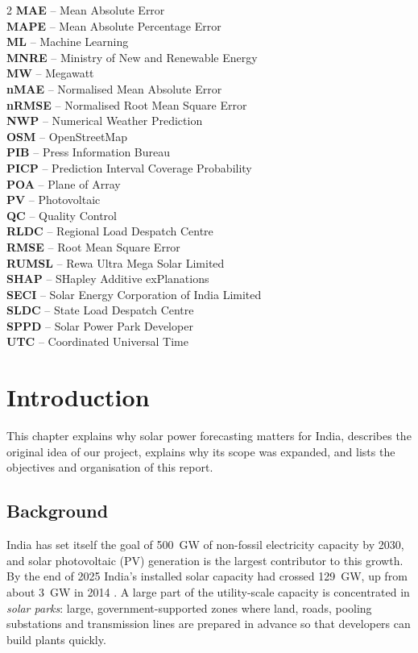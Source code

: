 \documentclass[12pt]{report}
\begin{document}
\begin{multicols}{2}
\textbf{MAE} -- Mean Absolute Error\\
\textbf{MAPE} -- Mean Absolute Percentage Error\\
\textbf{ML} -- Machine Learning\\
\textbf{MNRE} -- Ministry of New and Renewable Energy\\
\textbf{MW} -- Megawatt\\
\textbf{nMAE} -- Normalised Mean Absolute Error\\
\textbf{nRMSE} -- Normalised Root Mean Square Error\\
\textbf{NWP} -- Numerical Weather Prediction\\
\textbf{OSM} -- OpenStreetMap\\
\textbf{PIB} -- Press Information Bureau\\
\textbf{PICP} -- Prediction Interval Coverage Probability\\
\textbf{POA} -- Plane of Array\\
\textbf{PV} -- Photovoltaic\\
\textbf{QC} -- Quality Control\\
\textbf{RLDC} -- Regional Load Despatch Centre\\
\textbf{RMSE} -- Root Mean Square Error\\
\textbf{RUMSL} -- Rewa Ultra Mega Solar Limited\\
\textbf{SHAP} -- SHapley Additive exPlanations\\
\textbf{SECI} -- Solar Energy Corporation of India Limited\\
\textbf{SLDC} -- State Load Despatch Centre\\
\textbf{SPPD} -- Solar Power Park Developer\\
\textbf{UTC} -- Coordinated Universal Time
\end{multicols}
\clearpage

\chapter{Introduction}
This chapter explains why solar power forecasting matters for India, describes the original idea of our project, explains why its scope was expanded, and lists the objectives and organisation of this report.

\section{Background}
\vspace{1mm}
India has set itself the goal of 500~GW of non-fossil electricity capacity by 2030, and solar photovoltaic (PV) generation is the largest contributor to this growth. By the end of 2025 India's installed solar capacity had crossed 129~GW, up from about 3~GW in 2014 \cite{pib2199729}. A large part of the utility-scale capacity is concentrated in \textit{solar parks}: large, government-supported zones where land, roads, pooling substations and transmission lines are prepared in advance so that developers can build plants quickly.\\
\end{document}
